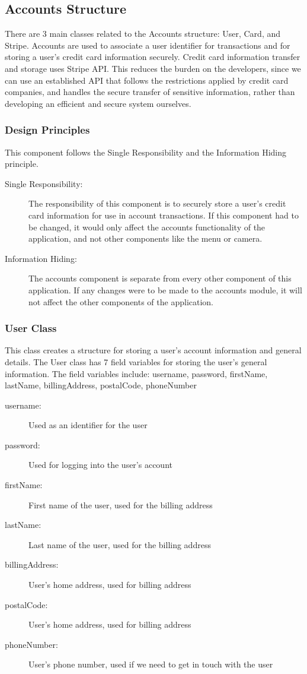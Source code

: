 \documentclass[12pt, titlepage]{article}
\begin{document}
\subsection{Accounts Structure}
There are 3 main classes related to the Accounts structure: User, Card, and Stripe. Accounts are used to associate a user identifier for transactions and for storing a user's credit card information securely. Credit card information transfer and storage uses Stripe API. This reduces the burden on the developers, since we can use an established API that follows the restrictions applied by credit card companies, and handles the secure transfer of sensitive information, rather than developing an efficient and secure system ourselves.

\subsubsection{Design Principles}
This component follows the Single Responsibility and the Information Hiding principle.  

\begin{description}
	\item[Single Responsibility:] The responsibility of this component is to securely store a user's credit card information for use in account transactions. If this component had to be changed, it would only affect the accounts functionality of the application, and not other components like the menu or camera.
	\item[Information Hiding:] The accounts component is separate from every other component of this application. If any changes were to be made to the accounts module, it will not affect the other components of the application.
\end{description}

\subsubsection{User Class}
This class creates a structure for storing a user's account information and general details. The User class has 7 field variables for storing the user's general information. The field variables include: username, password, firstName, lastName, billingAddress, postalCode, phoneNumber

\begin{description}
  \item[username:] Used as an identifier for the user 
  \item[password:] Used for logging into the user's account 
  \item[firstName:] First name of the user, used for the billing address
  \item[lastName:] Last name of the user, used for the billing address
  \item[billingAddress:] User's home address, used for billing address
  \item[postalCode:] User's home address, used for billing address
  \item[phoneNumber:] User's phone number, used if we need to get in touch with the user
\end{description}
\end{document}
